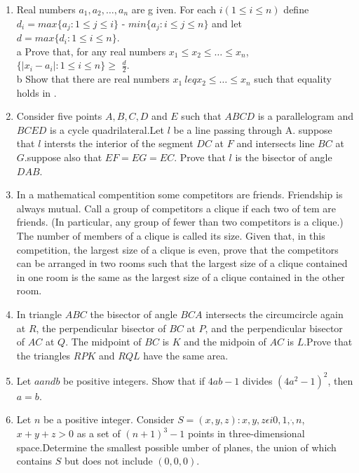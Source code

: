 \documentclass[12pt,-letter paper]{article}                           \usepackage{gvv}
\begin{document}
\begin{enumerate}
	\item Real numbers $a_1, a_2, \dots, a_n$ are g    iven. For each $i(1 \leq i \leq n)$ define \\
$d_i=max \{a_j : 1 \leq j \leq i\}$ - $min\{a_j : i \leq j \leq n\}$ and let \\
$d = max\{d_i : 1 \leq i \leq n\}$.\\
 \brak a Prove that, for any real numbers $x_1 \leq x_2 \leq \dots \leq x_n$, \\
$\{ | x_i - a_i | : 1 \leq  i \leq n \} \geq$  $\frac {d}{2}$. \brak * \\
\brak b Show that there are real numbers $x_1 \    leq x_2 \leq \dots \leq x_n$ such that equality     holds in \brak *.
\item Consider five points $A,B,C,D$ and $E$ such that $ABCD$ is a parallelogram and $BCED$ is a cycle quadrilateral.Let $l$ be a line passing through A. suppose that $l$ intersts the interior of the segment $DC$ at $F$ and intersects line $BC$ at $G$.suppose also that $EF=EG=EC$. Prove that $l$ is the bisector of angle $DAB$.
\item In a mathematical compentition some competitors are friends. Friendship is always mutual. Call a group of competitors a clique if each two of tem are friends. (In particular, any group of fewer than two competitors is a clique.) The number of members of a clique is called its size.
	Given that, in this competition, the largest size of a clique is even, prove that the competitors can be arranged in two rooms such that the largest size of a clique contained in one room is the same as the largest size of a clique contained in the other room.
\item In triangle $ABC$ the bisector of angle $BCA$ intersects the circumcircle again at $R$, the perpendicular bisector of $BC$ at $P$, and the perpendicular bisector of $AC$ at $Q$. The midpoint of $BC$ is $K$ and the midpoin of $AC$ is $L$.Prove that the triangles $RPK$ and $RQL$ have the same area.
\item Let $a and b$ be positive integers. Show that if $4ab-1$ divides $(4a^2-1)^2$, then $a=b$.
\item Let $n$ be a positive integer. Consider
	$S={(x,y,z)} : {x,y,z} \epsilon i{0,1,\dot,n}$, ${x+y+z>0}$ 
		as a set of $(n+1)^{3}-1$ points in three-dimensional space.Determine the smallest possible umber of planes, the union of which contains $S$ but does not include $(0,0,0)$.
\end{enumerate}
\end{document}
